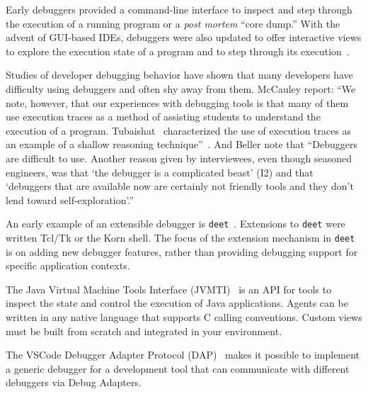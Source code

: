 \documentclass[sigplan,screen]{acmart} %
\newcommand\on[1]{\nbc{ON}{#1}{olive}} %
\newcommand\deet{{\tt deet}\xspace}
\begin{document}

Early debuggers provided a command-line interface to inspect and step through the execution of a running program or a \emph{post mortem} ``core dump.''
With the advent of GUI-based IDEs, debuggers were also updated to offer interactive views to explore the execution state of a program and to step through its execution~\cite{Rose96a}.

Studies of developer debugging behavior have shown that many developers have difficulty using debuggers and often shy away from them.
McCauley \etal report:
``We note, however, that our experiences with debugging tools is that many of them use execution traces as a method of assisting students to understand the execution of a program.
Tubaishat~\cite{Tuba01a} characterized the use of execution traces as an example of a shallow reasoning technique''~\cite{McCa08a}.
And Beller \etal note that
``Debuggers are difficult to use.
Another reason given by interviewees, even though seasoned engineers, was that `the debugger is a complicated beast' (I2) and that `debuggers that are available now are certainly not friendly tools and they don't lend toward self-exploration'.''
\cite{Bell18a}

An early example of an extensible debugger is \deet~\cite{Hans97a}.
Extensions to \deet were written Tcl/Tk or the Korn shell.
The focus of the extension mechanism in \deet is on adding new debugger features, rather than providing debugging support for specific application contexts.

The Java Virtual Machine Tools Interface (JVMTI)~\cite{JVMTI24} is an API for tools to inspect the state and control the execution of Java applications.
Agents can be written in any native language that supports C calling conventions.
Custom views must be built from scratch and integrated in your environment.

The VSCode Debugger Adapter Protocol (DAP)~\cite{DAP21} makes it possible to implement a generic debugger for a development tool that can communicate with different debuggers via Debug Adapters.
\end{document}
